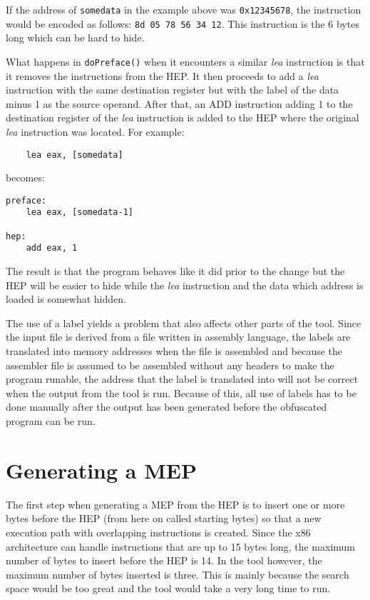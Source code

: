 \documentclass[11pt,twoside]{eitExjobb}
\begin{document}
If the address of \texttt{somedata} in the example above was \texttt{0x12345678}, the instruction would be encoded as follows: \texttt{8d 05 78 56 34 12}. This instruction is the 6 bytes long which can be hard to hide. 

What happens in \texttt{doPreface()} when it encounters a similar \emph{lea} instruction is that it removes the instructions from the HEP. It then proceeds to add a \emph{lea} instruction with the same destination register but with the label of the data minus 1 as the source operand. After that, an ADD instruction adding 1 to the destination register of the \emph{lea} instruction is added to the HEP where the original \emph{lea} instruction was located. For example:

\begin{verbatim}
    lea eax, [somedata]
\end{verbatim}

\noindent becomes:

\begin{verbatim}
preface:
    lea eax, [somedata-1]

hep:
    add eax, 1
\end{verbatim}

\noindent The result is that the program behaves like it did prior to the change but the HEP will be easier to hide while the \emph{lea} instruction and the data which address is loaded is somewhat hidden.

The use of a label yields a problem that also affects other parts of the tool. Since the input file is derived from a file written in assembly language, the labels are translated into memory addresses when the file is assembled and because the assembler file is assumed to be assembled without any headers to make the program runable, the address that the label is translated into will not be correct when the output from the tool is run. Because of this, all use of labels has to be done manually after the output has been generated before the obfuscated program can be run.


\section{Generating a MEP}
The first step when generating a MEP from the HEP is to insert one or more bytes before the HEP (from here on called starting bytes) so that a new execution path with overlapping instructions is created. Since the x86 architecture can handle instructions that are up to 15 bytes long, the maximum number of bytes to insert before the HEP is 14. In the tool however, the maximum number of bytes inserted is three. This is mainly because the search space would be too great and the tool would take a very long time to run. 
\end{document}
